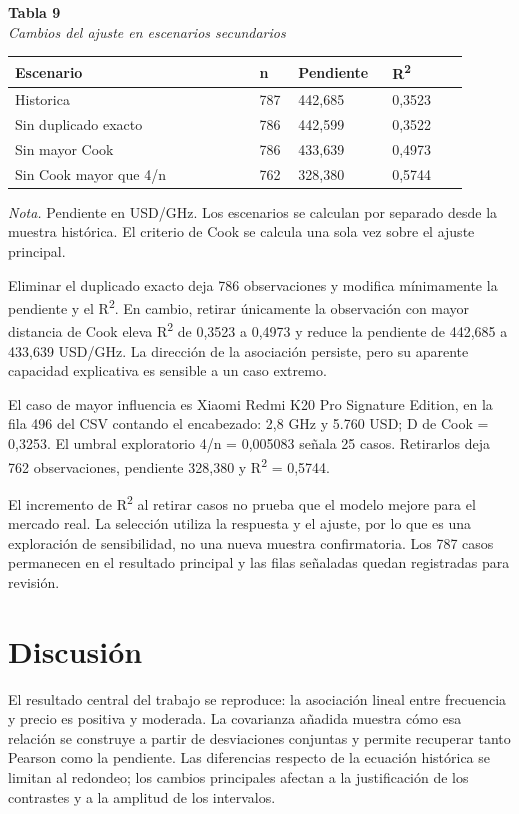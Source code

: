 \documentclass[12pt,letterpaper]{article}
\begin{document}
\begin{center}\begin{minipage}{\linewidth}\textbf{Tabla 9}\\\textit{Cambios del ajuste en escenarios secundarios}\\\begin{singlespace}\small
\begin{tabular}{@{}p{0.4829\linewidth}p{0.0705\linewidth}p{0.1880\linewidth}p{0.1560\linewidth}@{}}\toprule
\textbf{Escenario} & \textbf{n} & \textbf{Pendiente} & \textbf{R\textsuperscript{2}}\\\midrule
Historica & 787 & 442,685 & 0,3523\\
Sin duplicado exacto & 786 & 442,599 & 0,3522\\
Sin mayor Cook & 786 & 433,639 & 0,4973\\
Sin Cook mayor que 4/n & 762 & 328,380 & 0,5744\\
\bottomrule\end{tabular}\end{singlespace}
\small\textit{Nota.} Pendiente en USD/GHz. Los escenarios se calculan por separado desde la muestra histórica. El criterio de Cook se calcula una sola vez sobre el ajuste principal.
\end{minipage}\end{center}
Eliminar el duplicado exacto deja 786 observaciones y modifica mínimamente la pendiente y el R\textsuperscript{2}. En cambio, retirar únicamente la observación con mayor distancia de Cook eleva R\textsuperscript{2} de 0,3523 a 0,4973 y reduce la pendiente de 442,685 a 433,639 USD/GHz. La dirección de la asociación persiste, pero su aparente capacidad explicativa es sensible a un caso extremo.

El caso de mayor influencia es Xiaomi Redmi K20 Pro Signature Edition, en la fila 496 del CSV contando el encabezado: 2,8 GHz y 5.760 USD; D de Cook = 0,3253. El umbral exploratorio 4/n = 0,005083 señala 25 casos. Retirarlos deja 762 observaciones, pendiente 328,380 y R\textsuperscript{2} = 0,5744.

El incremento de R\textsuperscript{2} al retirar casos no prueba que el modelo mejore para el mercado real. La selección utiliza la respuesta y el ajuste, por lo que es una exploración de sensibilidad, no una nueva muestra confirmatoria. Los 787 casos permanecen en el resultado principal y las filas señaladas quedan registradas para revisión.

\clearpage
\section*{Discusión}
El resultado central del trabajo se reproduce: la asociación lineal entre frecuencia y precio es positiva y moderada. La covarianza añadida muestra cómo esa relación se construye a partir de desviaciones conjuntas y permite recuperar tanto Pearson como la pendiente. Las diferencias respecto de la ecuación histórica se limitan al redondeo; los cambios principales afectan a la justificación de los contrastes y a la amplitud de los intervalos.
\end{document}
